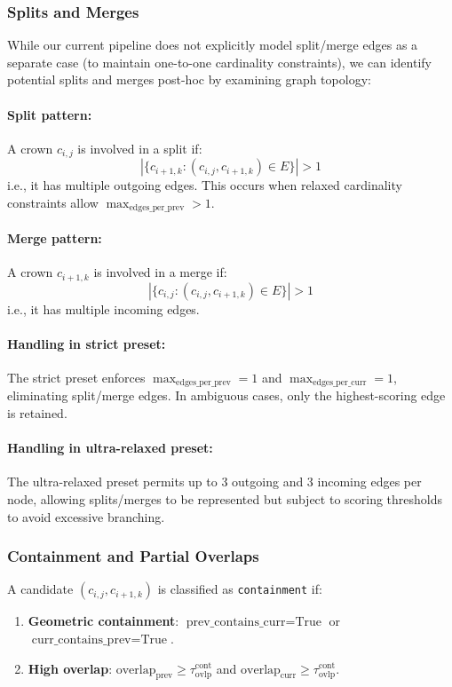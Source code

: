 \subsubsection{Splits and Merges}

While our current pipeline does not explicitly model split/merge edges as a separate case (to maintain one-to-one cardinality constraints), we can identify potential splits and merges post-hoc by examining graph topology:

\paragraph{Split pattern:} A crown $c_{i,j}$ is involved in a split if:
\[
|\{c_{i+1,k} : (c_{i,j}, c_{i+1,k}) \in E\}| > 1
\]
i.e., it has multiple outgoing edges. This occurs when relaxed cardinality constraints allow $\max_{\text{edges\_per\_prev}} > 1$.

\paragraph{Merge pattern:} A crown $c_{i+1,k}$ is involved in a merge if:
\[
|\{c_{i,j} : (c_{i,j}, c_{i+1,k}) \in E\}| > 1
\]
i.e., it has multiple incoming edges.

\paragraph{Handling in strict preset:} The strict preset enforces $\max_{\text{edges\_per\_prev}} = 1$ and $\max_{\text{edges\_per\_curr}} = 1$, eliminating split/merge edges. In ambiguous cases, only the highest-scoring edge is retained.

\paragraph{Handling in ultra-relaxed preset:} The ultra-relaxed preset permits up to 3 outgoing and 3 incoming edges per node, allowing splits/merges to be represented but subject to scoring thresholds to avoid excessive branching.

\subsubsection{Containment and Partial Overlaps}

A candidate $(c_{i,j}, c_{i+1,k})$ is classified as \texttt{containment} if:
\begin{enumerate}
    \item \textbf{Geometric containment}: $\text{prev\_contains\_curr} = \text{True}$ or $\text{curr\_contains\_prev} = \text{True}$.
    \item \textbf{High overlap}: $\text{overlap}_{\text{prev}} \geq \tau_{\text{ovlp}}^{\text{cont}}$ and $\text{overlap}_{\text{curr}} \geq \tau_{\text{ovlp}}^{\text{cont}}$.
\end{enumerate}

